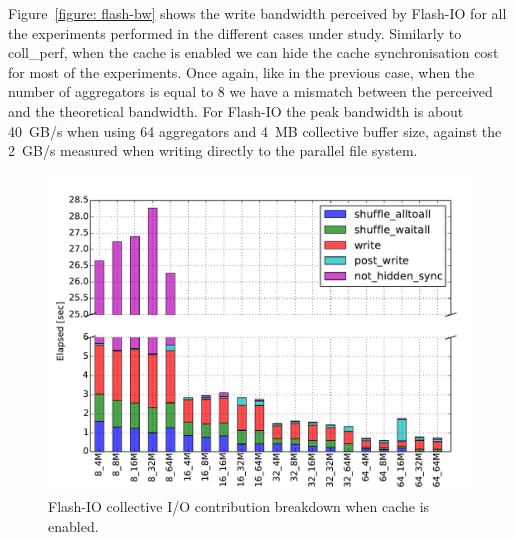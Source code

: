 Figure~\ref{figure: flash-bw} shows the write bandwidth perceived by Flash-IO for all the experiments performed in the different cases under study. Similarly to coll\_perf, when the cache is enabled we can hide the cache synchronisation cost for most of the experiments. Once again, like in the previous case, when the number of aggregators is equal to 8 we have a mismatch between the perceived and the theoretical bandwidth. For Flash-IO the peak bandwidth is about 40~GB/s when using 64 aggregators and 4~MB collective buffer size, against the 2~GB/s measured when writing directly to the parallel file system.
\begin{figure}[htb]
  \centering
  \includegraphics[width=0.95\columnwidth]{figures/flash_32GB_30sec_elapsed_enable}
  \caption{Flash-IO collective I/O contribution breakdown when cache is enabled.}
  \label{figure: flash-elaps-enable}
\end{figure}

